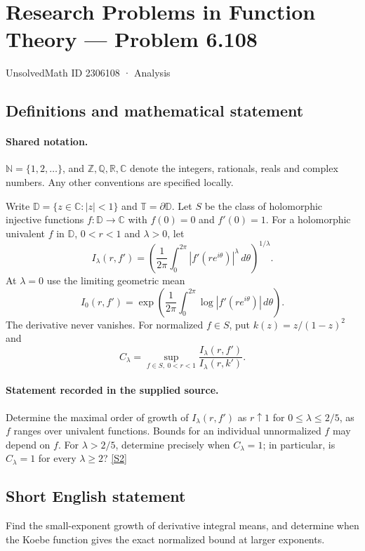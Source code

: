\documentclass[11pt]{article}
\newcommand{\sref}[2]{\hyperlink{source:#1:#2}{[S#2]}}
\begin{document}
\setcounter{section}{2306107}
\section{Research Problems in Function Theory — Problem 6.108}\label{2306108}
{\small\sffamily UnsolvedMath ID 2306108 · Analysis}
\subsection{Definitions and mathematical statement}

\paragraph{Shared notation.}$\mathbb N=\{1,2,\ldots\}$, and $\mathbb Z,\mathbb Q,\mathbb R,\mathbb C$ denote the integers, rationals, reals and complex numbers. Any other conventions are specified locally.


Write $\mathbb D=\{z\in\mathbb C:|z|<1\}$ and $\mathbb T=\partial\mathbb D$. Let $S$ be the class of holomorphic injective functions $f:\mathbb D\to\mathbb C$ with $f(0)=0$ and $f'(0)=1$. For a holomorphic univalent $f$ in $\mathbb D$, $0<r<1$ and $\lambda>0$, let
\[I_\lambda(r,f')=\left(\frac1{2\pi}\int_0^{2\pi}|f'(re^{i\theta})|^\lambda\,d\theta\right)^{1/\lambda}.\]
At $\lambda=0$ use the limiting geometric mean
\[I_0(r,f')=\exp\left(\frac1{2\pi}\int_0^{2\pi}\log|f'(re^{i\theta})|\,d\theta\right).\]
The derivative never vanishes. For normalized $f\in S$, put $k(z)=z/(1-z)^2$ and
\[C_\lambda=\sup_{f\in S,\ 0<r<1}\frac{I_\lambda(r,f')}{I_\lambda(r,k')}.\]
\paragraph{Statement recorded in the supplied source.}
Determine the maximal order of growth of $I_\lambda(r,f')$ as $r\uparrow1$ for $0\leq\lambda\leq2/5$, as $f$ ranges over univalent functions. Bounds for an individual unnormalized $f$ may depend on $f$. For $\lambda>2/5$, determine precisely when $C_\lambda=1$; in particular, is $C_\lambda=1$ for every $\lambda\geq2$? \sref{2306108}{2}
\subsection{Short English statement}
Find the small-exponent growth of derivative integral means, and determine when the Koebe function gives the exact normalized bound at larger exponents.
\end{document}

